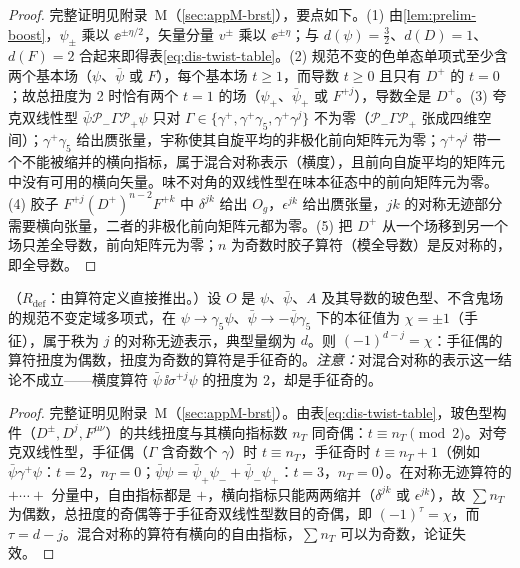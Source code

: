 \begin{proof}
完整证明见附录~M（\cref{sec:appM-brst}），要点如下。(1) 由\cref{lem:prelim-boost}，$\psi_\pm$ 乘以 $\ee^{\pm\eta/2}$，矢量分量 $v^\pm$ 乘以 $\ee^{\pm\eta}$；与 $d(\psi)=\frac32$、$d(D)=1$、$d(F)=2$ 合起来即得表\cref{eq:dis-twist-table}。(2) 规范不变的色单态单项式至少含两个基本场（$\psi$、$\bar\psi$ 或 $F$），每个基本场 $t\ge1$，而导数 $t\ge0$ 且只有 $D^+$ 的 $t=0$；故总扭度为 2 时恰有两个 $t=1$ 的场（$\psi_+$、$\bar\psi_+$ 或 $F^{+j}$），导数全是 $D^+$。(3) 夸克双线性型 $\bar\psi\mathcal P_-\Gamma\mathcal P_+\psi$ 只对 $\Gamma\in\{\gamma^+,\gamma^+\gamma_5,\gamma^+\gamma^j\}$ 不为零（$\mathcal P_-\Gamma\mathcal P_+$ 张成四维空间）；$\gamma^+\gamma_5$ 给出赝张量，宇称使其自旋平均的非极化前向矩阵元为零；$\gamma^+\gamma^j$ 带一个不能被缩并的横向指标，属于混合对称表示（横度），且前向自旋平均的矩阵元中没有可用的横向矢量。味不对角的双线性型在味本征态中的前向矩阵元为零。(4) 胶子 $F^{+j}(D^+)^{n-2}F^{+k}$ 中 $\delta^{jk}$ 给出 $O_g$，$\epsilon^{jk}$ 给出赝张量，$jk$ 的对称无迹部分需要横向张量，二者的非极化前向矩阵元都为零。(5) 把 $D^+$ 从一个场移到另一个场只差全导数，前向矩阵元为零；$n$ 为奇数时胶子算符（模全导数）是反对称的，即全导数。
\end{proof}

\begin{lemma}\label{lem:dis-twist-chirality}
（$R_{\mathrm{def}}$：由算符定义直接推出。）设 $O$ 是 $\psi$、$\bar\psi$、$A$ 及其导数的玻色型、不含鬼场的规范不变定域多项式，在 $\psi\to\gamma_5\psi$、$\bar\psi\to-\bar\psi\gamma_5$ 下的本征值为 $\chi=\pm1$（手征），属于秩为 $j$ 的对称无迹表示，典型量纲为 $d$。则 $(-1)^{d-j}=\chi$：手征偶的算符扭度为偶数，扭度为奇数的算符是手征奇的。\emph{注意：}对混合对称的表示这一结论不成立——横度算符 $\bar\psi\,\ii\sigma^{+j}\psi$ 的扭度为 2，却是手征奇的。
\end{lemma}

\begin{proof}
完整证明见附录~M（\cref{sec:appM-brst}）。由表\cref{eq:dis-twist-table}，玻色型构件（$D^\pm,D^j,F^{\mu\nu}$）的共线扭度与其横向指标数 $n_T$ 同奇偶：$t\equiv n_T\pmod 2$。对夸克双线性型，手征偶（$\Gamma$ 含奇数个 $\gamma$）时 $t\equiv n_T$，手征奇时 $t\equiv n_T+1$（例如 $\bar\psi\gamma^+\psi$：$t=2$，$n_T=0$；$\bar\psi\psi=\bar\psi_+\psi_-+\bar\psi_-\psi_+$：$t=3$，$n_T=0$）。在对称无迹算符的 $+\cdots+$ 分量中，自由指标都是 $+$，横向指标只能两两缩并（$\delta^{jk}$ 或 $\epsilon^{jk}$），故 $\sum n_T$ 为偶数，总扭度的奇偶等于手征奇双线性型数目的奇偶，即 $(-1)^{\tau}=\chi$，而 $\tau=d-j$。混合对称的算符有横向的自由指标，$\sum n_T$ 可以为奇数，论证失效。
\end{proof}

